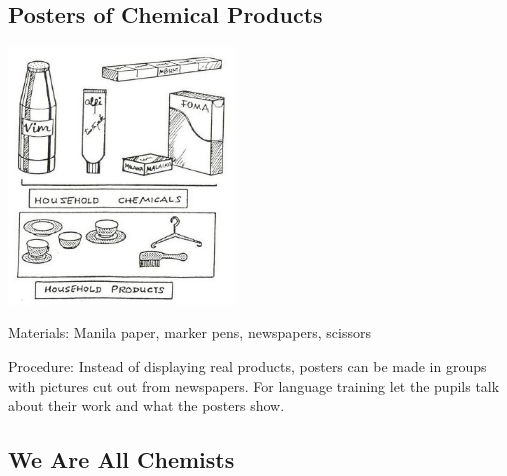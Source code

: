 \begin{multicols}{2}
\subsection{Posters of Chemical Products}  

\begin{center}
\includegraphics[width=0.45\textwidth]{./img/source/chemical-posters.jpg}
\end{center}

\begin{description*}
\item[Materials:]{Manila paper, marker pens, newspapers, scissors}
\item[Procedure:]{Instead of displaying real products, posters
can be made in groups with pictures cut out
from newspapers. For language training let the
pupils talk about their work and what the posters
show.}
\end{description*}

\subsection{We Are All Chemists}


\end{multicols}
